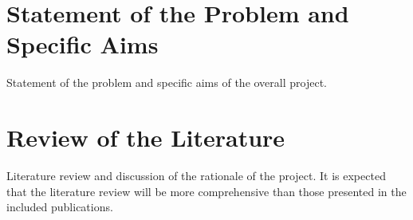 \clearpage\section{Statement of the Problem and Specific Aims}\label{intro}

Statement of the problem and specific aims of the overall project.

\clearpage\section{Review of the Literature}\label{sec:pre}

Literature review and discussion of the rationale of the project.
It is expected that the literature review will be more comprehensive than
those presented in the included publications.


